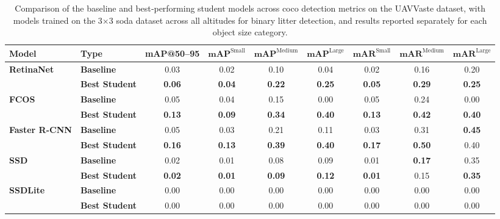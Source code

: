 \begin{table*}[htbp]
\centering
\renewcommand{\arraystretch}{1.5} %
\begin{adjustbox}{width=\textwidth}
\begin{tabular}{llccccccc}
\hline
\textbf{Model} & \textbf{Type} & \textbf{mAP@50--95} & \(\mathbf{mAP}^{\text{Small}}\) & \(\mathbf{mAP}^{\text{Medium}}\) & \(\mathbf{mAP}^{\text{Large}}\) & \(\mathbf{mAR}^{\text{Small}}\) & \(\mathbf{mAR}^{\text{Medium}}\) & \(\mathbf{mAR}^{\text{Large}}\) \\ \hline
\multirow{2}{*}{\textbf{RetinaNet}} 
 & \textbf{Baseline}      & 0.03 & 0.02 & 0.10 & 0.04 & 0.02 & 0.16 & 0.20 \\
 & \textbf{Best Student}  & \textbf{0.06} & \textbf{0.04} & \textbf{0.22} & \textbf{0.25} & \textbf{0.05} & \textbf{0.29} & \textbf{0.25} \\ \hline
\multirow{2}{*}{\textbf{FCOS}} 
 & \textbf{Baseline}      & 0.05 & 0.04 & 0.15 & 0.00 & 0.05 & 0.24 & 0.00 \\
 & \textbf{Best Student}  & \textbf{0.13} & \textbf{0.09} & \textbf{0.34} & \textbf{0.40} & \textbf{0.13} & \textbf{0.42} & \textbf{0.40} \\ \hline
\multirow{2}{*}{\textbf{Faster R-CNN}} 
 & \textbf{Baseline}      & 0.05 & 0.03 & 0.21 & 0.11 & 0.03 & 0.31 & \textbf{0.45} \\
 & \textbf{Best Student}  & \textbf{0.16} & \textbf{0.13} & \textbf{0.39} & \textbf{0.40} & \textbf{0.17} & \textbf{0.50} & 0.40 \\ \hline
\multirow{2}{*}{\textbf{SSD}} 
 & \textbf{Baseline}      & 0.02 & 0.01 & 0.08 & 0.09 & 0.01 & \textbf{0.17} & 0.35 \\
 & \textbf{Best Student}  & \textbf{0.02} & \textbf{0.01} & \textbf{0.09} & \textbf{0.12} & \textbf{0.01} & 0.15 & \textbf{0.35} \\ \hline
\multirow{2}{*}{\textbf{SSDLite}} 
 & \textbf{Baseline}      & 0.00 & 0.00 & 0.00 & 0.00 & 0.00 & 0.00 & 0.00 \\
 & \textbf{Best Student}  & 0.00 & 0.00 & 0.00 & 0.00 & 0.00 & 0.00 & 0.00 \\ \hline
\end{tabular}
\end{adjustbox}
\caption{Comparison of the baseline and best‐performing student models across \gls{coco} detection metrics on the UAVVaste dataset, with models trained on the 3$\times$3 \gls{soda} dataset across all altitudes for binary litter detection, and results reported separately for each object size category.}
\label{tab:uavvaste_object_sizes_split}
\end{table*}

